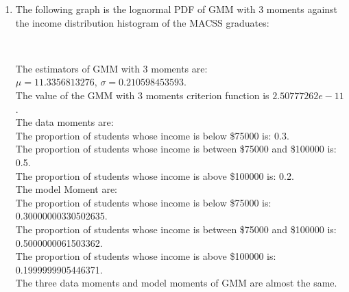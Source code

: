 \documentclass[letterpaper,12pt]{article}
\theoremstyle{definition}
\numberwithin{equation}{section}
\begin{document}
\begin{enumerate} [\bfseries (a)]
\item The following graph is the lognormal PDF of GMM with 3 moments against the income distribution histogram of the MACSS graduates:
\begin{figure}[H]
\centering
{}\
\end{figure}\par
The estimators of GMM with 3 moments are: \(\mu = 11.3356813276, \, \sigma = 0.210598453593\). \\
The value of the GMM with 3 moments criterion function is \(2.50777262e-11\).\\
The data moments are:\\
The proportion of students whose income is below \$75000 is: 0.3.\\
The proportion of students whose income is between \$75000 and \$100000 is: 0.5.\\
The proportion of students whose income is above \$100000 is: 0.2.\\
The model Moment are:\\
The proportion of students whose income is below \$75000 is: 0.30000000330502635. \\
The proportion of students whose income is between \$75000 and \$100000 is: 0.5000000061503362.\\
The proportion of students whose income is above \$100000 is: 0.1999999905446371.\\
The three data moments and model moments of GMM are almost the same.\par	


\end{enumerate}
\end{document}

